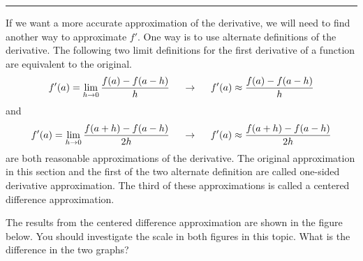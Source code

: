 \documentclass[10pt,fleqn]{article}
\begin{document}
\vskip0.1in\hrule\vskip0.1in \noindent
If we want a more accurate approximation of the derivative, we will need to find
another way to approximate \(f'\). One way is to use alternate definitions of
the derivative. The following two limit definitions for the first derivative of
a function are equivalent to the original. 
\[
  f'(a) = \lim_{h\rightarrow 0} {{f(a)-f(a-h)}\over{h}}
     \ \ \ \ \rightarrow \ \ \ \ f'(a) \approx {{f(a)-f(a-h)}\over{h}}
\]
and
\[
  f'(a) = \lim_{h\rightarrow 0} {{f(a+h)-f(a-h)}\over{2h}}
     \ \ \ \ \rightarrow \ \ \ \ f'(a) \approx {{f(a+h)-f(a-h)}\over{2h}}
\]
are both reasonable approximations of the derivative. The original approximation
in this section and the first of the two alternate definition are called
one-sided derivative approximation. The third of these approximations is called
a centered difference approximation.

The results from the centered difference approximation are shown in the figure
below. You should investigate the scale in both figures in this topic. What is
the difference in the two graphs?
\end{document}
